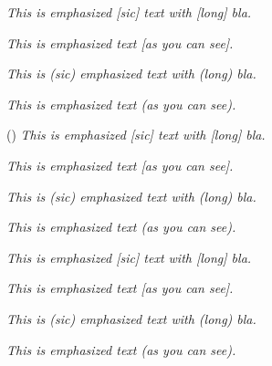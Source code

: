 \documentclass{scrartcl}
\begin{document}
\emph{This is emphasized [sic] text with [long] bla.}

\emph{This is emphasized text [as you can see].}

\emph{This is (sic) emphasized text with (long) bla.}

\emph{This is emphasized text (as you can see).}

\hrulefill

\DeleteEmph[]
\DeleteEmph()
\AddEmph{[}{]}
\AddEmph{(}{)}
\emph{This is emphasized [sic] text with [long] bla.}

\emph{This is emphasized text [as you can see].}

\emph{This is (sic) emphasized text with (long) bla.}

\emph{This is emphasized text (as you can see).}

\hrulefill

\emph{This is emphasized [sic] text with [long] bla.}

\emph{This is emphasized text [as you can see].}

\emph{This is (sic) emphasized text with (long) bla.}

\emph{This is emphasized text (as you can see).}
\end{document}

